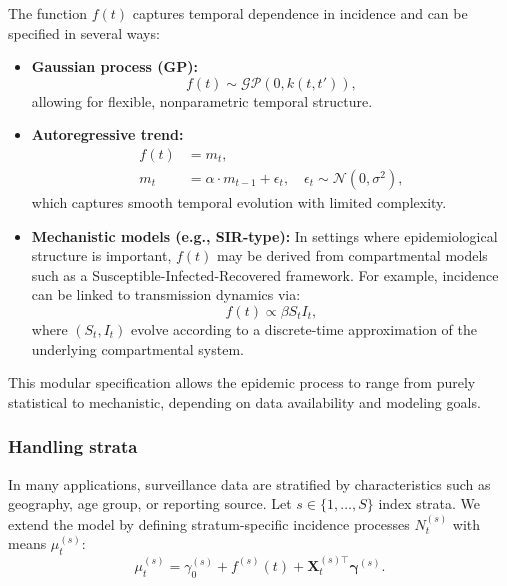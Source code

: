 \documentclass[12pt]{article}
\begin{document}
The function $f(t)$ captures temporal dependence in incidence and can be specified in several ways:

\begin{itemize}
    \item \textbf{Gaussian process (GP):}
    \begin{equation}
        f(t) \sim \mathcal{GP}(0, k(t,t')),
    \end{equation}
    allowing for flexible, nonparametric temporal structure.

    \item \textbf{Autoregressive trend:}
    \begin{equation}
    \begin{aligned}
        f(t) &= m_t, \\
        m_t &= \alpha\cdot  m_{t-1} + \epsilon_t, \quad \epsilon_t \sim \mathcal{N}(0, \sigma^2),
    \end{aligned}
    \end{equation}
    which captures smooth temporal evolution with limited complexity.

    \item \textbf{Mechanistic models (e.g., SIR-type):} In settings where epidemiological structure is important, $f(t)$ may be derived from compartmental models such as a Susceptible-Infected-Recovered framework. For example, incidence can be linked to transmission dynamics via:
    \begin{equation}
        f(t) \propto \beta S_t I_t,
    \end{equation}
    where $(S_t, I_t)$ evolve according to a discrete-time approximation of the underlying compartmental system.
\end{itemize}

This modular specification allows the epidemic process to range from purely statistical to mechanistic, depending on data availability and modeling goals.

\subsubsection{Handling strata}

In many applications, surveillance data are stratified by characteristics such as geography, age group, or reporting source. Let $s \in \{1, \dots, S\}$ index strata. We extend the model by defining stratum-specific incidence processes $N_t^{(s)}$ with means $\mu_t^{(s)}$:
\begin{equation}
    \mu_t^{(s)} = \gamma_0^{(s)} + f^{(s)}(t) + \mathbf{X}_t^{(s)\top} \boldsymbol{\gamma}^{(s)}.
\end{equation}
\end{document}
